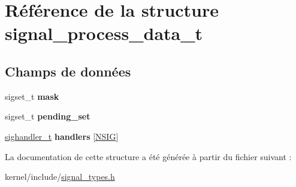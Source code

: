\hypertarget{structsignal__process__data__t}{\section{Référence de la structure signal\+\_\+process\+\_\+data\+\_\+t}
\label{structsignal__process__data__t}
}
\subsection*{Champs de données}
\begin{DoxyCompactItemize}
\item 
\hypertarget{structsignal__process__data__t_a397d720abbb70447cb1837012fa808e8}{sigset\+\_\+t {\bfseries mask}}\label{structsignal__process__data__t_a397d720abbb70447cb1837012fa808e8}

\item 
\hypertarget{structsignal__process__data__t_a072dbf9762b10b9b8b545622fcbfef92}{sigset\+\_\+t {\bfseries pending\+\_\+set}}\label{structsignal__process__data__t_a072dbf9762b10b9b8b545622fcbfef92}

\item 
\hypertarget{structsignal__process__data__t_acfd78d7210d6b09d6ffcf8d5c0ed8c24}{\hyperlink{signal_8h_a564498016effaee1f3384e07b7ced24f}{sighandler\+\_\+t} {\bfseries handlers} \mbox{[}\hyperlink{signal_8h_ab83b88daaecc469d1edb90a527ab4a39}{N\+S\+I\+G}\mbox{]}}\label{structsignal__process__data__t_acfd78d7210d6b09d6ffcf8d5c0ed8c24}

\end{DoxyCompactItemize}


La documentation de cette structure a été générée à partir du fichier suivant \+:\begin{DoxyCompactItemize}
\item 
kernel/include/\hyperlink{signal__types_8h}{signal\+\_\+types.\+h}\end{DoxyCompactItemize}
